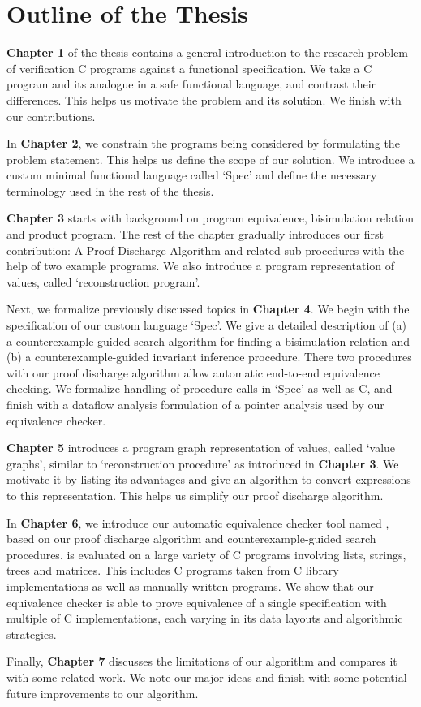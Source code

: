 \vspace{-12px}
\section{Outline of the Thesis}
\vspace{-10px}
\label{sec:outlinethesis}
\textbf{Chapter 1} of the thesis contains a general introduction to the research problem of verification C programs against a functional specification.
We take a C program and its analogue in a safe functional language, and contrast their differences. This helps us motivate the problem and its solution.
We finish with our contributions.

In \textbf{Chapter 2}, we constrain the programs being considered by formulating the problem statement. This helps us define the scope of our solution.
We introduce a custom minimal functional language called `Spec' and define the necessary terminology used in the rest of the thesis.

\textbf{Chapter 3} starts with background on program equivalence, bisimulation relation and product program.
The rest of the chapter gradually introduces our first contribution: A Proof Discharge Algorithm and related sub-procedures with the help
of two example programs. We also introduce a program representation of values, called `reconstruction program'.

Next, we formalize previously discussed topics in \textbf{Chapter 4}. We begin with the specification of our custom language `Spec'.
We give a detailed description of (a) a counterexample-guided search algorithm for finding a bisimulation relation and (b) a counterexample-guided
invariant inference procedure. There two procedures with our proof discharge algorithm allow automatic end-to-end equivalence checking.
We formalize handling of procedure calls in `Spec' as well as C, and finish with a dataflow analysis formulation of a pointer analysis
used by our equivalence checker.

\textbf{Chapter 5} introduces a program graph representation of values, called `value graphs', similar to `reconstruction procedure' as introduced in \textbf{Chapter 3}.
We motivate it by listing its advantages and give an algorithm to convert expressions to this representation.
This helps us simplify our proof discharge algorithm.

In \textbf{Chapter 6}, we introduce our automatic equivalence checker tool named \toolName{}, based on our proof discharge algorithm
and counterexample-guided search procedures.
\toolName{} is evaluated on a large variety of C programs involving lists, strings, trees and matrices.
This includes C programs taken from C library implementations as well as manually written programs. We show that our equivalence checker is able
to prove equivalence of a single specification with multiple of C implementations, each varying in its data layouts and algorithmic
strategies.

Finally, \textbf{Chapter 7} discusses the limitations of our algorithm and compares it with some related work. We note our major ideas and finish with
some potential future improvements to our algorithm.
